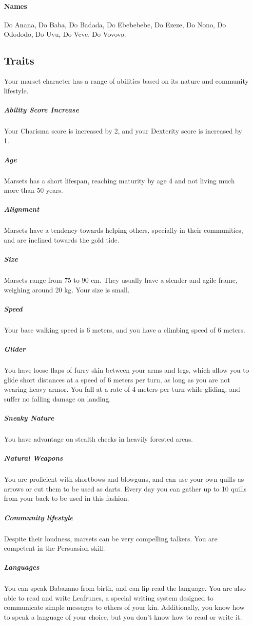     \paragraph{Names}
    Do Anana, Do Baba, Do Badada, Do Ebebebebe, Do Ezeze, Do Nono, Do Odododo, Do Uvu, Do Veve, Do Vovovo.

\subsection*{Traits}
    Your marset character has a range of abilities based on its nature and community lifestyle.

    \subparagraph{Ability Score Increase} Your Charisma score is increased by 2, and your Dexterity score is increased by 1.

    \subparagraph{Age} Marsets has a short lifespan, reaching maturity by age 4 and not living much more than 50 years.

    \subparagraph{Alignment} Marsets have a tendency towards helping others, specially in their communities, and are inclined towards the gold tide.

    \subparagraph{Size} Marsets range from 75 to 90 cm.
    They usually have a slender and agile frame, weighing around 20 kg.
    Your size is small.

    \subparagraph{Speed} Your base walking speed is 6 meters, and you have a climbing speed of 6 meters.

    \subparagraph{Glider} You have loose flaps of furry skin between your arms and legs, which allow you to glide short distances at a speed of 6 meters per turn, as long as you are not wearing heavy armor.
    You fall at a rate of 4 meters per turn while gliding, and suffer no falling damage on landing.

    \subparagraph{Sneaky Nature} You have advantage on stealth checks in heavily forested areas.

    \subparagraph{Natural Weapons} You are proficient with shortbows and blowguns, and can use your own quills as arrows or cut them to be used as darts.
    Every day you can gather up to 10 quills from your back to be used in this fashion.

    \subparagraph{Community lifestyle} Despite their loudness, marsets can be very compelling talkers.
    You are competent in the Persuasion skill.

    \subparagraph{Languages} You can speak Babazano from birth, and can lip-read the language.
    You are also able to read and write Leafrunes, a special writing system designed to communicate simple messages to others of your kin.
    Additionally, you know how to speak a language of your choice, but you don't know how to read or write it.

